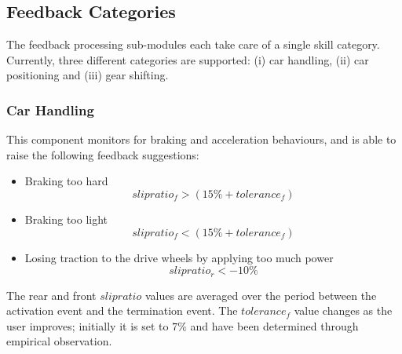 \subsection{Feedback Categories}
The feedback processing sub-modules each take care of a single skill category. Currently, three different categories are supported: (i) car handling, (ii) car positioning and (iii) gear shifting. 

\subsubsection{Car Handling}
This component monitors for braking and acceleration behaviours, and is able to raise the following feedback suggestions:
\begin{itemize}
	\item Braking too hard \\
	\begin{equation}
		slipratio_f > (15\% + tolerance_f)
	\end{equation}
	\item Braking too light
	\begin{equation}
		slipratio_f < (15\% + tolerance_f)
	\end{equation}
	\item Losing traction to the drive wheels by applying too much power
	\begin{equation}
		slipratio_r < -10\%
	\end{equation}
\end{itemize}

The rear and front $slipratio$ values are averaged over the period between the activation event and the termination event. The $tolerance_f$ value changes as the user improves; initially it is set to $7\%$ and have been determined through empirical observation.

